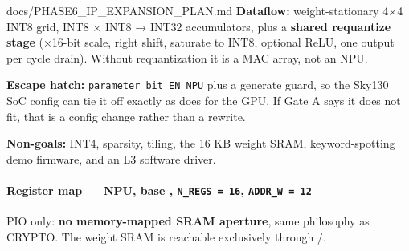 \begin{relocated}{docs/PHASE6_IP_EXPANSION_PLAN.md}
\textbf{Dataflow:} weight-stationary 4×4 INT8 grid, INT8 × INT8 → INT32
accumulators, plus a \textbf{shared requantize stage} (×16-bit scale,
right shift, saturate to INT8, optional ReLU, one output per cycle
drain). Without requantization it is a MAC array, not an NPU.

\textbf{Escape hatch:} \texttt{parameter\ bit\ EN\_\allowbreak{}NPU}
plus a generate guard, so the Sky130 SoC config can tie it off exactly
as  does for the GPU. If Gate A
says it does not fit, that is a config change rather than a rewrite.

\textbf{Non-goals:} INT4, sparsity, tiling, the 16 KB weight SRAM,
keyword-spotting demo firmware, and an L3 software driver.

\paragraph{\texorpdfstring{Register map --- NPU, base
, \texttt{N\_\allowbreak{}REGS\ =\allowbreak{}\ 16},
\texttt{ADDR\_\allowbreak{}W\ =\allowbreak{}\ 12}}{Register map --- NPU, base , , }}\label{ds:ch:phase6-ip-expansion-plan:register-map-npu-base-0x2001-0000-n-regs-16-addr-w-12}

PIO only: \textbf{no memory-mapped SRAM aperture}, same philosophy as
CRYPTO. The weight SRAM is reachable exclusively through
/.

{\small\setlength{\tabcolsep}{4pt}

}
\end{relocated}
